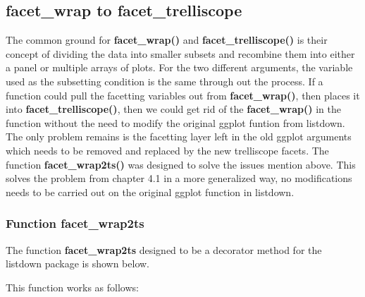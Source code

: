 \documentclass[
]{article}
\begin{document}
\hypertarget{facet_wrap-to-facet_trelliscope}{%
\subsection{facet\_wrap to
facet\_trelliscope}\label{facet_wrap-to-facet_trelliscope}}

The common ground for \textbf{facet\_wrap()} and
\textbf{facet\_trelliscope()} is their concept of dividing the data into
smaller subsets and recombine them into either a panel or multiple
arrays of plots. For the two different arguments, the variable used as
the subsetting condition is the same through out the process. If a
function could pull the facetting variables out from
\textbf{facet\_wrap()}, then places it into
\textbf{facet\_trelliscope()}, then we could get rid of the
\textbf{facet\_wrap()} in the function without the need to modify the
original ggplot funtion from listdown. The only problem remains is the
facetting layer left in the old ggplot arguments which needs to be
removed and replaced by the new trelliscope facets. The function
\textbf{facet\_wrap2ts()} was designed to solve the issues mention
above. This solves the problem from chapter 4.1 in a more generalized
way, no modifications needs to be carried out on the original ggplot
function in listdown.

\hypertarget{function-facet_wrap2ts}{%
\subsubsection{Function facet\_wrap2ts}\label{function-facet_wrap2ts}}

The function \textbf{facet\_wrap2ts} designed to be a decorator method
for the listdown package is shown below.

This function works as follows:
\end{document}

